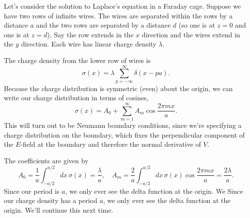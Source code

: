 \begin{exm}
    Let's consider the solution to Laplace's equation in a Faraday cage. Suppose we have two rows of infinite wires. The wires are separated within the rows by a distance $a$ and the two rows are separated by a distance $d$ (so one is at $z=0$ and one is at $z=d$). Say the row extends in the $x$ direction and the wires extend in the $y$ direction. Each wire has linear charge density $\lambda$.
    
    The charge density from the lower row of wires is
    \begin{equation}
        \sigma(x) = \lambda \sum_{p=-\infty}^\infty \delta(x-pa).
    \end{equation}
    Because the charge distribution is symmetric (even) about the origin, we can write our charge distribution in terms of cosines,
    \begin{equation}
        \sigma(x) = A_0 + \sum_{m=1}^\infty A_m \cos \frac{2\pi m x}{a}.
    \end{equation}
    This will turn out to be Neumann boundary conditions, since we're specifying a charge distribution on the boundary, which fixes the perpendicular component of the $E$-field at the boundary and therefore the normal derivative of $V$.
    
    The coefficients are given by
    \begin{equation}
        A_0 = \frac{1}{a} \int_{-a/2}^{a/2} dx\, \sigma(x)  = \frac{\lambda}{a}, \quad A_m =\frac{2}{a} \int_{-a/2}^{a/2} dx \,\sigma(x) \cos \frac{2\pi mx}{a} = \frac{2\lambda}{a}.
    \end{equation}
    Since our period is $a$, we only ever see the delta function at the origin. We    Since our charge density has a period $a$, we only ever see the delta function at the origin. We'll continue this next time.
\end{exm}